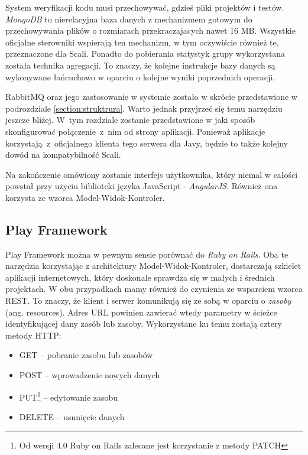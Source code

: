 \documentclass[wimgr]{xmgr}
\begin{document}
System weryfikacji kodu musi przechowywać, gdzieś pliki projektów i testów. \emph{MongoDB} to nierelacyjna baza danych z mechanizmem gotowym do przechowywania plików o rozmiarach przekraczajacych nawet 16 MB. Wszystkie oficjalne sterowniki wspierają ten mechanizm, w tym oczywiście również te, przeznaczone dla Scali. Ponadto do pobierania statystyk grupy wykorzystana została technika agregacji. To znaczy, że kolejne instrukcje bazy danych są wykonywane łańcuchowo w oparciu o kolejne wyniki poprzednich operacji.

RabbitMQ oraz jego zastosowanie w systemie zostało w skrócie przedstawione w podrozdziale \ref{section:struktrura}. Warto jednak przyjrzeć się temu narzędziu jeszcze bliżej. W~tym rozdziale zostanie przedstawione w jaki sposób skonfigurować połączenie~z~nim od strony aplikacji. Ponieważ aplikacje korzystają~z~oficjalnego klienta tego serwera dla Javy, będzie to także kolejny dowód na kompatybilność Scali.

Na zakończenie omówiony zostanie interfejs użytkownika, który niemal w całości powstał przy użyciu biblioteki języka JavaScript - \emph{AngularJS}. Również ona korzysta ze wzorca Model-Widok-Kontroler.  

\subsection{Play Framework}

Play Framework można w pewnym sensie porównać do \emph{Ruby on Rails}. Oba te narzędzia korzystając z architektury Model-Widok-Kontroler, dostarczają szkielet aplikacji internetowych, który doskonale sprawdza się w małych i średnich projektach. W obu przypadkach mamy również do czynienia ze wsparciem wzorca REST. To znaczy, że klient i serwer komunikują się ze sobą w oparciu o \emph{zasoby} (ang. resources). Adres URL powinien zawierać wtedy parametry w ścieżce identyfikującej dany zasób lub zasoby. Wykorzystane ku temu zostają cztery metody HTTP:

\begin{itemize}
\item GET -- pobranie zasobu lub zasobów
\item POST -- wprowadzenie nowych danych
\item PUT\footnote{Od wersji 4.0 Ruby on Rails zalecane jest korzystanie z metody PATCH} -- edytowanie zasobu
\item DELETE -- usunięcie danych
\end{itemize}
\end{document}
